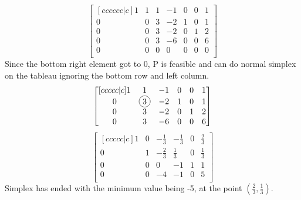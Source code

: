 \documentclass[12pt]{article}
\newcommand*\circled[1]{\tikz[baseline=(char.base)]{
		\node[shape=circle,draw,inner sep=2pt] (char) {#1};}}
\newenvironment{exercise}[2][Exercise]{\begin{trivlist}
		\item[\hskip \labelsep {\bfseries #1}\hskip \labelsep {\bfseries #2.}]}{\end{trivlist}}
\begin{document}
\begin{exercise}{3}
\[\begin{bmatrix}[cccccc|c]
	1 &  1 &  1 & -1 & 0 & 0 & 1\\
	0 &  0 &  3 & -2 & 1 & 0 & 1\\
	0 &  0 &  3 & -2 & 0 & 1 & 2\\
	0 &  0 &  3 & -6 & 0 & 0 & 6\\
	0 &  0 &  0 &  0 & 0 & 0 & 0\\
\end{bmatrix}\]
Since the bottom right element got to 0, P is feasible and can do normal simplex on the tableau ignoring the bottom row and left column.
\[\begin{bmatrix}[ccccc|c]
	1 &  1 & -1 & 0 & 0 & 1\\
	0 &  \circled{3} & -2 & 1 & 0 & 1\\
	0 &  3 & -2 & 0 & 1 & 2\\
	0 &  3 & -6 & 0 & 0 & 6\\
\end{bmatrix}\]
\[\begin{bmatrix}[ccccc|c]
	1 &  0 & -\frac{1}{3} & -\frac{1}{3} & 0 & \frac{2}{3}\\
	0 &  1 & -\frac{2}{3} & \frac{1}{3} & 0 & \frac{1}{3}\\
	0 &  0 &  0 & -1 & 1 & 1\\
	0 &  0 & -4 & -1 & 0 & 5\\
\end{bmatrix}\]
Simplex has ended with the minimum value being -5, at the point $(\frac{2}{3},\frac{1}{3})$.
\end{exercise}
\end{document}
